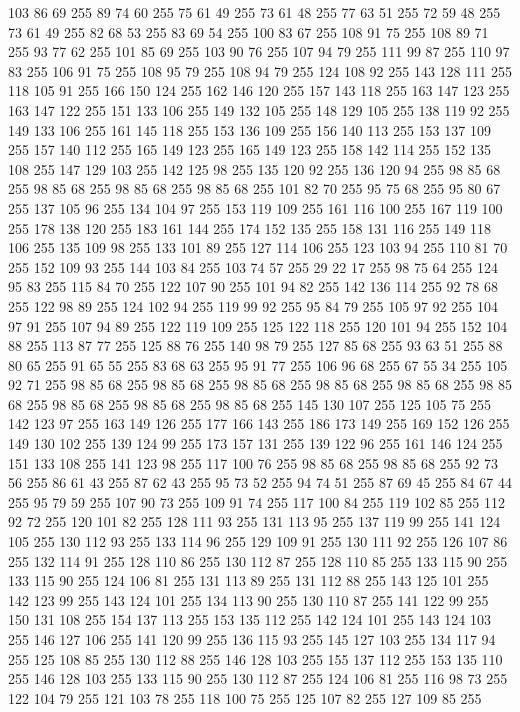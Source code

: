103 86 69 255 89 74 60 255 75 61 49 255 73 61 48 255 77 63 51 255 72 59 48 255 73 61 49 255 82 68 53 255 83 69 54 255 100 83 67 255 108 91 75 255 108 89 71 255 93 77 62 255 101 85 69 255 103 90 76 255 107 94 79 255 111 99 87 255 110 97 83 255 106 91 75 255 108 95 79 255 108 94 79 255 124 108 92 255 143 128 111 255 118 105 91 255 166 150 124 255 162 146 120 255 157 143 118 255 163 147 123 255 163 147 122 255 151 133 106 255 149 132 105 255 148 129 105 255 138 119 92 255 149 133 106 255 161 145 118 255 153 136 109 255 156 140 113 255 153 137 109 255 157 140 112 255 165 149 123 255 165 149 123 255 158 142 114 255 152 135 108 255 147 129 103 255 142 125 98 255 135 120 92 255 136 120 94 255 98 85 68 255 98 85 68 255 98 85 68 255 98 85 68 255 101 82 70 255 95 75 68 255 95 80 67 255 137 105 96 255 134 104 97 255 153 119 109 255 161 116 100 255 167 119 100 255 178 138 120 255 183 161 144 255 174 152 135 255 158 131 116 255 149 118 106 255
135 109 98 255 133 101 89 255 127 114 106 255 123 103 94 255 110 81 70 255 152 109 93 255 144 103 84 255 103 74 57 255 29 22 17 255 98 75 64 255 124 95 83 255 115 84 70 255 122 107 90 255 101 94 82 255 142 136 114 255 92 78 68 255 122 98 89 255 124 102 94 255 119 99 92 255 95 84 79 255 105 97 92 255 104 97 91 255 107 94 89 255 122 119 109 255 125 122 118 255 120 101 94 255 152 104 88 255 113 87 77 255 125 88 76 255 140 98 79 255 127 85 68 255 93 63 51 255 88 80 65 255 91 65 55 255 83 68 63 255 95 91 77 255 106 96 68 255 67 55 34 255 105 92 71 255 98 85 68 255 98 85 68 255 98 85 68 255 98 85 68 255 98 85 68 255 98 85 68 255 98 85 68 255 98 85 68 255 98 85 68 255 145 130 107 255 125 105 75 255 142 123 97 255 163 149 126 255 177 166 143 255 186 173 149 255 169 152 126 255 149 130 102 255 139 124 99 255 173 157 131 255 139 122 96 255 161 146 124 255 151 133 108 255 141 123 98 255 117 100 76 255 98 85 68 255
98 85 68 255 92 73 56 255 86 61 43 255 87 62 43 255 95 73 52 255 94 74 51 255 87 69 45 255 84 67 44 255 95 79 59 255 107 90 73 255 109 91 74 255 117 100 84 255 119 102 85 255 112 92 72 255 120 101 82 255 128 111 93 255 131 113 95 255 137 119 99 255 141 124 105 255 130 112 93 255 133 114 96 255 129 109 91 255 130 111 92 255 126 107 86 255 132 114 91 255 128 110 86 255 130 112 87 255 128 110 85 255 133 115 90 255 133 115 90 255 124 106 81 255 131 113 89 255 131 112 88 255 143 125 101 255 142 123 99 255 143 124 101 255 134 113 90 255 130 110 87 255 141 122 99 255 150 131 108 255 154 137 113 255 153 135 112 255 142 124 101 255 143 124 103 255 146 127 106 255 141 120 99 255 136 115 93 255 145 127 103 255 134 117 94 255 125 108 85 255 130 112 88 255 146 128 103 255 155 137 112 255 153 135 110 255 146 128 103 255 133 115 90 255 130 112 87 255 124 106 81 255 116 98 73 255 122 104 79 255 121 103 78 255 118 100 75 255 125 107 82 255 127 109 85 255
